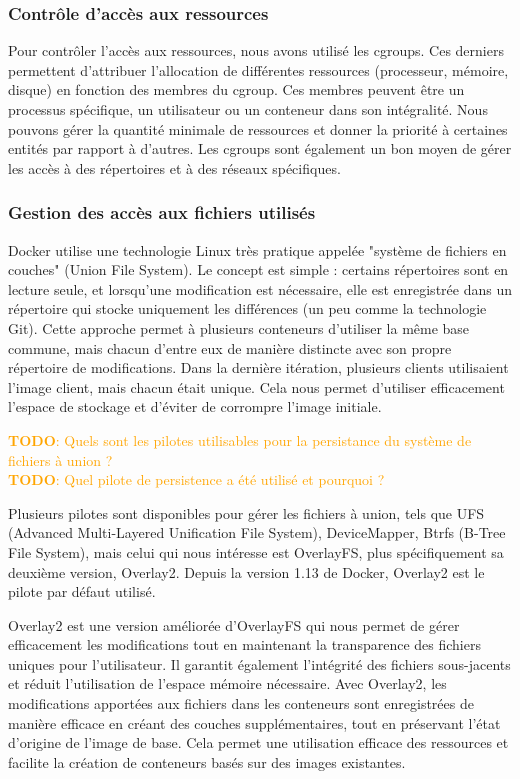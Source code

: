 \documentclass[a11paper, 11pt]{article}
\newcommand{\todo}[1]{\textcolor{orange}{\textbf{TODO}: #1}}
\begin{document}
\subsubsection{Contrôle d'accès aux ressources}

Pour contrôler l'accès aux ressources, nous avons utilisé les cgroups. Ces
derniers permettent d'attribuer l'allocation de différentes ressources
(processeur, mémoire, disque) en fonction des membres du cgroup. Ces membres
peuvent être un processus spécifique, un utilisateur ou un conteneur dans son
intégralité. Nous pouvons gérer la quantité minimale de ressources et donner la
priorité à certaines entités par rapport à d'autres. Les cgroups sont également
un bon moyen de gérer les accès à des répertoires et à des réseaux spécifiques.

\subsubsection{Gestion des accès aux fichiers utilisés}


Docker utilise une technologie Linux très pratique appelée "système de fichiers
en couches" (Union File System). Le concept est simple : certains répertoires
sont en lecture seule, et lorsqu'une modification est nécessaire, elle est
enregistrée dans un répertoire qui stocke uniquement les différences (un peu
comme la technologie Git). Cette approche permet à plusieurs conteneurs
d'utiliser la même base commune, mais chacun d'entre eux de manière distincte
avec son propre répertoire de modifications. Dans la dernière itération,
plusieurs clients utilisaient l'image client, mais chacun était unique. Cela
nous permet d'utiliser efficacement l'espace de stockage et d'éviter de
corrompre l'image initiale.


\todo{Quels sont les pilotes utilisables pour la persistance du système de fichiers
à union ?} \\
\todo{Quel pilote de persistence a été utilisé et pourquoi ?}

Plusieurs pilotes sont disponibles pour gérer les fichiers à union, tels que UFS (Advanced Multi-Layered Unification File System), DeviceMapper, Btrfs (B-Tree File System), mais celui qui nous intéresse est OverlayFS, plus spécifiquement sa deuxième version, Overlay2. Depuis la version 1.13 de Docker, Overlay2 est le pilote par défaut utilisé.

Overlay2 est une version améliorée d'OverlayFS qui nous permet de gérer
efficacement les modifications tout en maintenant la transparence des fichiers
uniques pour l'utilisateur. Il garantit également l'intégrité des fichiers
sous-jacents et réduit l'utilisation de l'espace mémoire nécessaire. Avec
Overlay2, les modifications apportées aux fichiers dans les conteneurs sont
enregistrées de manière efficace en créant des couches supplémentaires, tout en
préservant l'état d'origine de l'image de base. Cela permet une utilisation
efficace des ressources et facilite la création de conteneurs basés sur des
images existantes.
\end{document}
